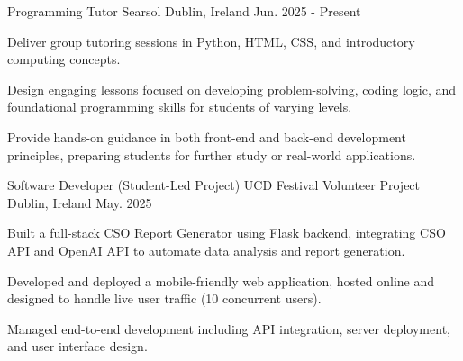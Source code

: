 
\begin{cventries}

  \cventry
    {Programming Tutor} %
    {Searsol} %
    {Dublin, Ireland} %
    {Jun. 2025 - Present} %
    {
      \begin{cvitems} %
        \item {Deliver group tutoring sessions in Python, HTML, CSS, and introductory computing concepts.}
        \item {Design engaging lessons focused on developing problem-solving, coding logic, and foundational programming skills for students of varying levels.}
        \item {Provide hands-on guidance in both front-end and back-end development principles, preparing students for further study or real-world applications.}
      \end{cvitems}
    }

  \cventry
    {Software Developer (Student-Led Project)} %
    {UCD Festival Volunteer Project} %
    {Dublin, Ireland} %
    {May. 2025} %
    {
      \begin{cvitems} %
        \item {Built a full-stack CSO Report Generator using Flask backend, integrating CSO API and OpenAI API to automate data analysis and report generation.}
        \item {Developed and deployed a mobile-friendly web application, hosted online and designed to handle live user traffic (10 concurrent users).}
        \item {Managed end-to-end development including API integration, server deployment, and user interface design.}
      \end{cvitems}
    }

\end{cventries}
